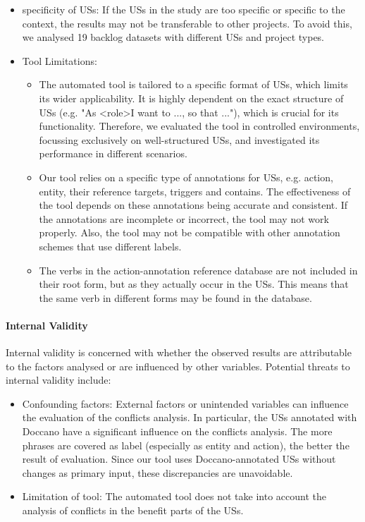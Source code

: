 \begin{itemize}
	\item specificity of USs: If the USs in the study are too specific or specific to the context, the results may not be transferable to other projects. To avoid this, we analysed 19 backlog datasets with different USs and project types.
	
	\item Tool Limitations:
	\begin{itemize}
		
	 \item The automated tool is tailored to a specific format of USs, which limits its wider applicability. It is highly dependent on the exact structure of USs (e.g. "As \textless role\textgreater I want to ..., so that ..."), which is crucial for its functionality. Therefore, we evaluated the tool in controlled environments, focussing exclusively on well-structured USs, and investigated its performance in different scenarios.
	
	\item Our tool relies on a specific type of annotations for USs, e.g. action, entity, their reference targets, triggers and contains. The effectiveness of the tool depends on these annotations being accurate and consistent. If the annotations are incomplete or incorrect, the tool may not work properly. Also, the tool may not be compatible with other annotation schemes that use different labels.
	
	\item The verbs in the action-annotation reference database are not included in their root form, but as they actually occur in the USs. This means that the same verb in different forms may be found in the database.
\end{itemize}
\end{itemize}
\paragraph{Internal Validity}Internal validity is concerned with whether the observed results are attributable to the factors analysed or are influenced by other variables. Potential threats to internal validity include:
\begin{itemize}
	\item Confounding factors: External factors or unintended variables can influence the evaluation of the conflicts analysis. In particular, the USs annotated with Doccano have a significant influence on the conflicts analysis. The more phrases are covered as label (especially as entity and action), the better the result of evaluation. Since our tool uses Doccano-annotated USs without changes as primary input, these discrepancies are unavoidable.
	
	\item Limitation of tool: The automated tool does not take into account the analysis of conflicts in the benefit parts of the USs.
\end{itemize}
